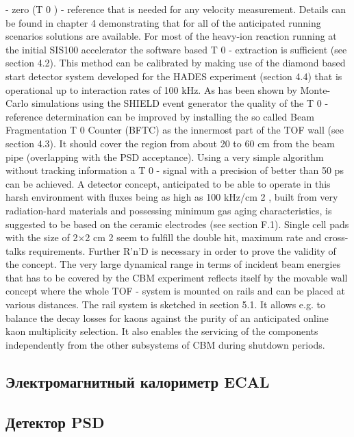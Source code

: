 - zero (T 0 ) - reference that is needed for any velocity measurement. Details can be found in chapter 4
demonstrating that for all of the anticipated running scenarios solutions are available. For most of the
heavy-ion reaction running at the initial SIS100 accelerator the software based T 0 - extraction is sufficient
(see section 4.2). This method can be calibrated by making use of the diamond based start detector
system developed for the HADES experiment (section 4.4) that is operational up to interaction rates of
100 kHz.
As has been shown by Monte-Carlo simulations using the SHIELD event generator the quality of the T 0
- reference determination can be improved by installing the so called Beam Fragmentation T 0 Counter
(BFTC) as the innermost part of the TOF wall (see section 4.3). It should cover the region from about
20 to 60 cm from the beam pipe (overlapping with the PSD acceptance). Using a very simple algorithm
without tracking information a T 0 - signal with a precision of better than 50 ps can be achieved. A detector
concept, anticipated to be able to operate in this harsh environment with fluxes being as high as 100
kHz/cm 2 , built from very radiation-hard materials and possessing minimum gas aging characteristics, is
suggested to be based on the ceramic electrodes (see section F.1). Single cell pads with the size of 2$\times$2
cm 2 seem to fulfill the double hit, maximum rate and cross-talks requirements. Further R'n'D is necessary
in order to prove the validity of the concept.
The very large dynamical range in terms of incident beam energies that has to be covered by the CBM
experiment reflects itself by the movable wall concept where the whole TOF - system is mounted on rails
and can be placed at various distances. The rail system is sketched in section 5.1. It allows e.g. to
balance the decay losses for kaons against the purity of an anticipated online kaon multiplicity selection.
It also enables the servicing of the components independently from the other subsystems of CBM during
shutdown periods.

\subsection{Электромагнитный калориметр ECAL}\label{sec:secECAL}

\subsection{Детектор PSD}\label{sec:secPSD}
